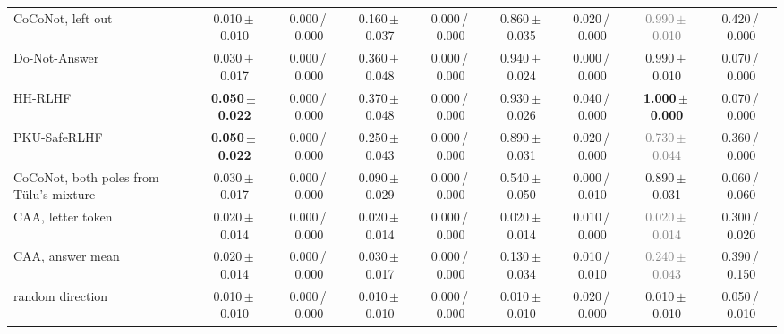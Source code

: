 \begin{tabular}{@{}lcccccccc@{}}
CoCoNot, left out & 0.010\,{\scriptsize$\pm$\,0.010} & {\scriptsize 0.000\,/\,0.000} & 0.160\,{\scriptsize$\pm$\,0.037} & {\scriptsize 0.000\,/\,0.000} & 0.860\,{\scriptsize$\pm$\,0.035} & {\scriptsize 0.020\,/\,0.000} & \textcolor{gray}{0.990\,{\scriptsize$\pm$\,0.010}} & {\scriptsize 0.420\,/\,0.000} \\
Do-Not-Answer & 0.030\,{\scriptsize$\pm$\,0.017} & {\scriptsize 0.000\,/\,0.000} & 0.360\,{\scriptsize$\pm$\,0.048} & {\scriptsize 0.000\,/\,0.000} & 0.940\,{\scriptsize$\pm$\,0.024} & {\scriptsize 0.000\,/\,0.000} & 0.990\,{\scriptsize$\pm$\,0.010} & {\scriptsize 0.070\,/\,0.000} \\
HH-RLHF & \textbf{0.050\,{\scriptsize$\pm$\,0.022}} & {\scriptsize 0.000\,/\,0.000} & 0.370\,{\scriptsize$\pm$\,0.048} & {\scriptsize 0.000\,/\,0.000} & 0.930\,{\scriptsize$\pm$\,0.026} & {\scriptsize 0.040\,/\,0.000} & \textbf{1.000\,{\scriptsize$\pm$\,0.000}} & {\scriptsize 0.070\,/\,0.000} \\
PKU-SafeRLHF & \textbf{0.050\,{\scriptsize$\pm$\,0.022}} & {\scriptsize 0.000\,/\,0.000} & 0.250\,{\scriptsize$\pm$\,0.043} & {\scriptsize 0.000\,/\,0.000} & 0.890\,{\scriptsize$\pm$\,0.031} & {\scriptsize 0.020\,/\,0.000} & \textcolor{gray}{0.730\,{\scriptsize$\pm$\,0.044}} & {\scriptsize 0.360\,/\,0.000} \\
CoCoNot, both poles from T\"ulu's mixture & 0.030\,{\scriptsize$\pm$\,0.017} & {\scriptsize 0.000\,/\,0.000} & 0.090\,{\scriptsize$\pm$\,0.029} & {\scriptsize 0.000\,/\,0.000} & 0.540\,{\scriptsize$\pm$\,0.050} & {\scriptsize 0.000\,/\,0.010} & 0.890\,{\scriptsize$\pm$\,0.031} & {\scriptsize 0.060\,/\,0.060} \\
CAA, letter token & 0.020\,{\scriptsize$\pm$\,0.014} & {\scriptsize 0.000\,/\,0.000} & 0.020\,{\scriptsize$\pm$\,0.014} & {\scriptsize 0.000\,/\,0.000} & 0.020\,{\scriptsize$\pm$\,0.014} & {\scriptsize 0.010\,/\,0.000} & \textcolor{gray}{0.020\,{\scriptsize$\pm$\,0.014}} & {\scriptsize 0.300\,/\,0.020} \\
CAA, answer mean & 0.020\,{\scriptsize$\pm$\,0.014} & {\scriptsize 0.000\,/\,0.000} & 0.030\,{\scriptsize$\pm$\,0.017} & {\scriptsize 0.000\,/\,0.000} & 0.130\,{\scriptsize$\pm$\,0.034} & {\scriptsize 0.010\,/\,0.010} & \textcolor{gray}{0.240\,{\scriptsize$\pm$\,0.043}} & {\scriptsize 0.390\,/\,0.150} \\
random direction & 0.010\,{\scriptsize$\pm$\,0.010} & {\scriptsize 0.000\,/\,0.000} & 0.010\,{\scriptsize$\pm$\,0.010} & {\scriptsize 0.000\,/\,0.000} & 0.010\,{\scriptsize$\pm$\,0.010} & {\scriptsize 0.020\,/\,0.000} & 0.010\,{\scriptsize$\pm$\,0.010} & {\scriptsize 0.050\,/\,0.010} \\
\bottomrule
\end{tabular}
